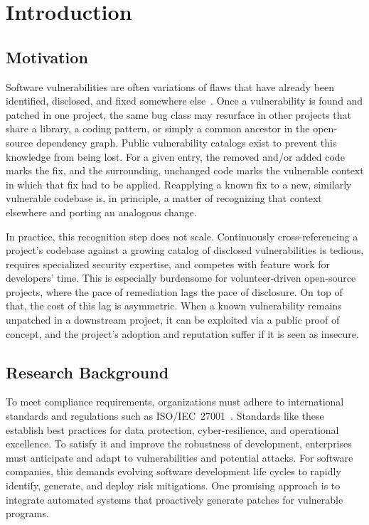 \chapter{Introduction}\label{chapter:introduction}

\section{Motivation}

Software vulnerabilities are often variations of flaws that have already been identified, disclosed, and fixed somewhere else~\cite{Kim2017VUDDY, Jang2012ReDeBug}.
Once a vulnerability is found and patched in one project, the same bug class may resurface in other projects that share a library, a coding pattern, or simply a common ancestor in the open-source dependency graph.
Public vulnerability catalogs exist to prevent this knowledge from being lost.
For a given entry, the removed and/or added code marks the fix, and the surrounding, unchanged code marks the vulnerable context in which that fix had to be applied.
Reapplying a known fix to a new, similarly vulnerable codebase is, in principle, a matter of recognizing that context elsewhere and porting an analogous change.

In practice, this recognition step does not scale.
Continuously cross-referencing a project's codebase against a growing catalog of disclosed vulnerabilities is tedious, requires specialized security expertise, and competes with feature work for developers' time.
This is especially burdensome for volunteer-driven open-source projects, where the pace of remediation lags the pace of disclosure.
On top of that, the cost of this lag is asymmetric. 
When a known vulnerability remains unpatched in a downstream project, it can be exploited via a public proof of concept, and the project's adoption and reputation suffer if it is seen as insecure.

\section{Research Background}

To meet compliance requirements, organizations must adhere to international standards and regulations such as ISO/IEC~27001~\cite{iso27001}.
Standards like these establish best practices for data protection, cyber-resilience, and operational excellence.
To satisfy it and improve the robustness of development, enterprises must anticipate and adapt to vulnerabilities and potential attacks.
For software companies, this demands evolving software development life cycles to rapidly identify, generate, and deploy risk mitigations.
One promising approach is to integrate automated systems that proactively generate patches for vulnerable programs.

